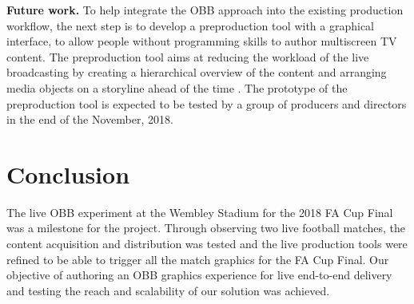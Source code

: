 \documentclass[sigchi-a, authorversion]{acmart}
\begin{document}
\textbf{Future work.} To help integrate the OBB approach into the existing
production workflow, the next step is to develop a preproduction tool with a
graphical interface, to allow people without programming skills to author
multiscreen TV content. The preproduction tool aims at reducing the workload of
the live broadcasting by creating a hierarchical overview of the content and
arranging media objects on a storyline ahead of the time \cite{Li:2018_TVX}. The
prototype of the preproduction tool is expected to be tested by a group of
producers and directors in the end of the November, 2018.

\section{Conclusion}
The live OBB experiment at the Wembley Stadium for the 2018 FA Cup Final was a
milestone for the project. Through observing two live football matches, the
content acquisition and distribution was tested and the live production tools
were refined to be able to trigger all the match graphics for the FA Cup Final.
Our objective of authoring an OBB graphics experience for live end-to-end
delivery and testing the reach and scalability of our solution was achieved.



\end{document}
